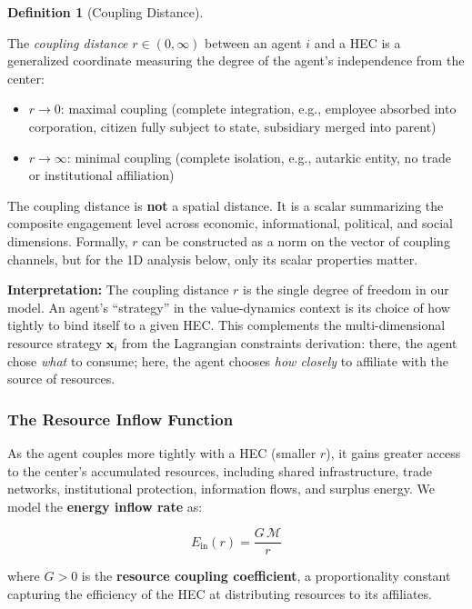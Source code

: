 \documentclass[11pt]{article}
\theoremstyle{plain}
\theoremstyle{definition}
\newtheorem{definition}{Definition}
\theoremstyle{remark}
\let\origsubsubsection\subsubsection
\renewcommand{\subsubsection}{\needspace{4\baselineskip}\origsubsubsection}
\begin{document}
\begin{definition}[Coupling Distance]
\label{def-coupling-distance}

The \emph{coupling distance} $r \in (0, \infty)$ between an agent $i$ and a HEC is a generalized coordinate measuring the degree of the agent's independence from the center:

\begin{itemize}
\item $r \to 0$: maximal coupling (complete integration, e.g., employee absorbed into corporation, citizen fully subject to state, subsidiary merged into parent)
\item $r \to \infty$: minimal coupling (complete isolation, e.g., autarkic entity, no trade or institutional affiliation)
\end{itemize}
The coupling distance is \textbf{not} a spatial distance. It is a scalar summarizing the composite engagement level across economic, informational, political, and social dimensions. Formally, $r$ can be constructed as a norm on the vector of coupling channels, but for the 1D analysis below, only its scalar properties matter.
\end{definition}

\textbf{Interpretation:} The coupling distance \(r\) is the single
degree of freedom in our model. An agent's ``strategy'' in the
value-dynamics context is its choice of how tightly to bind itself to a
given HEC. This complements the multi-dimensional resource strategy
\(\mathbf{x}_i\) from the Lagrangian constraints derivation: there, the
agent chose \emph{what} to consume; here, the agent chooses \emph{how
closely} to affiliate with the source of resources.

\subsubsection{The Resource Inflow
Function}\label{the-resource-inflow-function}

As the agent couples more tightly with a HEC (smaller \(r\)), it gains
greater access to the center's accumulated resources, including shared
infrastructure, trade networks, institutional protection, information
flows, and surplus energy. We model the \textbf{energy inflow rate} as:

\[E_{\text{in}}(r) = \frac{G \, \mathcal{M}}{r}\]

where \(G > 0\) is the \textbf{resource coupling coefficient}, a
proportionality constant capturing the efficiency of the HEC at
distributing resources to its affiliates.
\end{document}
